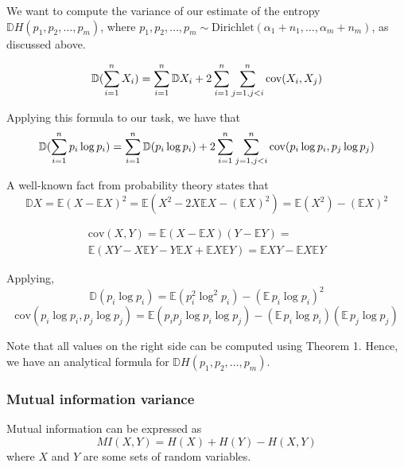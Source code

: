 \documentclass{article}
\begin{document}
We want to compute the variance of our estimate of the entropy $\mathbb{D}H(p_1, p_2, \ldots, p_m)$, where $p_1, p_2, \ldots, p_m \sim \textrm{Dirichlet}(\alpha_1 + n_1, \ldots, \alpha_m + n_m)$, as discussed above.

\begin{equation}
\mathbb{D}(\sum_{i = 1}^n{X_i}) = \sum_{i=1}^n{\mathbb{D}X_i} + 2 \sum_{i = 1}^n{\sum_{j = 1, \\ j < i}^n{{\textrm{cov}(X_i, X_j)}}}
\end{equation}

Applying this formula to our task, we have that
\begin{equation}
\mathbb{D}(\sum_{i = 1}^n{p_i \log{p_i}}) = \sum_{i=1}^n{\mathbb{D}(p_i \log{p_i})} + 2 \sum_{i = 1}^n{\sum_{j = 1, \\ j < i}^n{{\textrm{cov}(p_i \log{p_i}, p_j \log{p_j})}}}
\end{equation}

A well-known fact from probability theory states that
\begin{equation}
\mathbb{D}X = \mathbb{E}(X - \mathbb{E}X)^2 = \mathbb{E}(X^2 - 2X \mathbb{E}X - (\mathbb{E}X)^2) = \mathbb{E}(X^2) - (\mathbb{E}X)^2
\end{equation}

\begin{multline}
\textrm{cov}(X, Y) = \mathbb{E}(X - \mathbb{E}X)(Y - \mathbb{E}Y) = \\ \mathbb{E}(XY - X \mathbb{E}Y - Y \mathbb{E}X + \mathbb{E}X\mathbb{E}Y) = \mathbb{E}XY - \mathbb{E}X\mathbb{E}Y
\end{multline}

Applying,
\begin{equation}
\mathbb{D}(p_i \log{p_i}) = \mathbb{E}(p_i^2 \log^2{p_i}) - (\mathbb{E} \, p_i \log{p_i})^2 
\end{equation}
\begin{equation}
\textrm{cov}(p_i \log{p_i}, p_j \log{p_j}) = \mathbb{E}(p_i p_j \log{p_i} \log{p_j}) - (\mathbb{E} \, p_i \log{p_i})(\mathbb{E} \, p_j \log{p_j})
\end{equation}

Note that all values on the right side can be computed using Theorem 1. Hence, we have an analytical formula for $\mathbb{D}H(p_1, p_2, \ldots, p_m)$.

\subsubsection{Mutual information variance}
Mutual information can be expressed as  
\begin{equation}
MI(X, Y) = H(X) + H(Y) - H(X, Y)
\end{equation}
where $X$ and $Y$ are some sets of random variables. 
\end{document}
